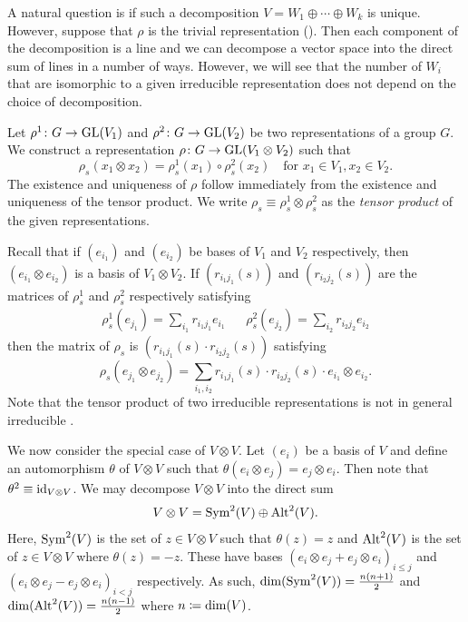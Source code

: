 \documentclass[letterpaper, 11pt, oneside]{book}
\begin{document}
A natural question is if such a decomposition $V = W_{1} \oplus \cdots \oplus W_{k}$ is unique.
However, suppose that $\rho$ is the trivial representation ().
Then each component of the decomposition is a line and we can decompose a vector space into the direct sum of lines in a number of ways.
However, we will see that the number of $W_{i}$ that are isomorphic to a given irreducible representation does not depend on the choice of decomposition.

\begin{defn}
  Let $\rho^{1}\colon G \to \operatorname{GL}(V_{1})$ and $\rho^{2}\colon G \to \operatorname{GL}(V_{2})$ be two representations of a group $G$.
  We construct a representation $\rho\colon G \to \operatorname{GL}(V_{1} \otimes V_{2})$ such that
  \[
    \rho_{s}(x_{1} \otimes x_{2}) = \rho_{s}^{1}(x_{1}) \circ \rho_{s}^{2}(x_{2}) \quad \text{for } x_{1} \in V_{1}, x_{2} \in V_{2}.
  \]
  The existence and uniqueness of $\rho$ follow immediately from the existence and uniqueness of the tensor product.
  We write $\rho_{s} \equiv \rho_{s}^{1} \otimes \rho_{s}^{2}$ as the \emph{tensor product} of the given representations.
\end{defn}

Recall that if $(e_{i_{1}})$ and $(e_{i_{2}})$ be bases of $V_{1}$ and $V_{2}$ respectively, then $(e_{i_{1}} \otimes e_{i_{2}})$ is a basis of $V_{1} \otimes V_{2}$.
If $(r_{i_{1}j_{1}}(s))$ and $(r_{i_{2}j_{2}}(s))$ are the matrices of $\rho_{s}^{1}$ and $\rho_{s}^{2}$ respectively satisfying
\begin{align*}
  \rho_{s}^{1}(e_{j_{1}}) = \sum_{i_{1}} r_{i_{1}j_{1}} e_{i_{1}} && \rho_{s}^{2}(e_{j_{2}}) = \sum_{i_{2}} r_{i_{2}j_{2}} e_{i_{2}}
\end{align*}
then the matrix of $\rho_{s}$ is $(r_{i_{1}j_{1}}(s) \cdot r_{i_{2}j_{2}}(s))$ satisfying
\[
  \rho_{s}(e_{j_{1}} \otimes e_{j_{2}}) = \sum_{i_{1}, i_{2}} r_{i_{1}j_{1}}(s) \cdot r_{i_{2}j_{2}}(s) \cdot e_{i_{1}} \otimes e_{i_{2}}.
\]
Note that the tensor product of two irreducible representations is not in general irreducible .

We now consider the special case of $V \otimes V$.
Let $(e_{i})$ be a basis of $V$ and define an automorphism $\theta$ of $V \otimes V$ such that $\theta(e_{i} \otimes e_{j}) = e_{j} \otimes e_{i}$.
Then note that $\theta^{2} \equiv \operatorname{id}_{V \otimes V}$.
We may decompose $V \otimes V$ into the direct sum
\[
  V \otimes V = \operatorname{Sym}^{2}(V) \oplus \operatorname{Alt}^{2}(V).
\]
Here, $\operatorname{Sym}^{2}(V)$ is the set of $z \in V \otimes V$ such that $\theta(z) = z$ and $\operatorname{Alt}^{2}(V)$ is the set of $z \in V \otimes V$ where $\theta(z) = -z$.
These have bases $(e_{i} \otimes e_{j} + e_{j} \otimes e_{i})_{i \leq j}$ and $(e_{i} \otimes e_{j} - e_{j} \otimes e_{i})_{i < j}$ respectively.
As such, $\dim(\operatorname{Sym}^{2}(V)) = \frac{n(n + 1)}{2}$ and $\dim(\operatorname{Alt}^{2}(V)) = \frac{n(n - 1)}{2}$ where $n \coloneqq \dim(V)$.
\end{document}
